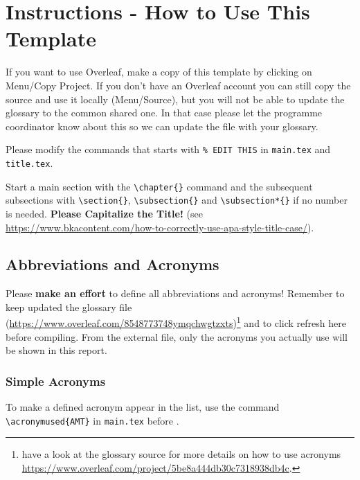 \chapter[Short Title Here]{Instructions - How to Use This Template}\label{sec:instr}
If you want to use Overleaf, make a copy of this template by clicking on Menu/Copy Project.
If you don't have an Overleaf account you can still copy the source and use it locally (Menu/Source), but you will not be able to update the glossary to the common shared one. In that case please let the programme coordinator know about this so we can update the file with your glossary.

Please modify the commands that starts with \verb|% EDIT THIS|
in \verb|main.tex| and \verb|title.tex|. 



Start a main section with the \verb|\chapter{}| command and the subsequent subsections with \verb|\section{}|, \verb|\subsection{}| and \verb|\subsection*{}| if no number is needed. \textbf{Please Capitalize the Title!} (see \url{https://www.bkacontent.com/how-to-correctly-use-apa-style-title-case/}).
\section{Abbreviations and Acronyms}
Please \textbf{make an effort} to define all abbreviations and acronyms!
Remember to keep updated the glossary file (\url{https://www.overleaf.com/8548773748ymqchwgtzxts})\footnote{have a look at the glossary source  for more details on how to use acronyms \url{https://www.overleaf.com/project/5be8a444db30c7318938db4c}.} and to click refresh here before compiling. From the external file, only the acronyms you actually use will be shown in this report.
\subsection*{Simple Acronyms}
To make a defined acronym appear in the list, use the command \verb|\acronymused{AMT}| in \verb|main.tex| before \verb||.
